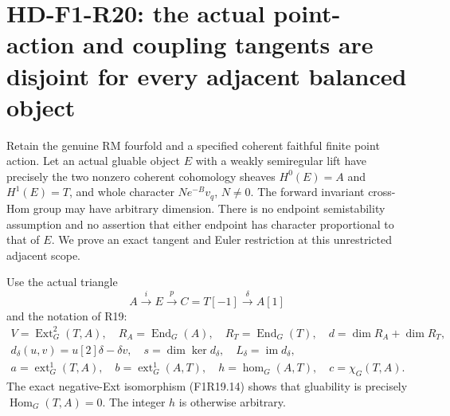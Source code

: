 \section[HD-F1-R20: unrestricted adjacent coupling tangents]{HD-F1-R20: the actual point-action and coupling tangents are disjoint for every adjacent balanced object}
\label{sec:followup-rm-unrestricted-adjacent-tangent}

Retain the genuine RM fourfold and a specified coherent
faithful finite point action. Let an actual gluable object
$E$ with a weakly semiregular lift have precisely the two
nonzero coherent cohomology sheaves $H^0(E)=A$ and
$H^1(E)=T$, and whole character $Ne^{-B}v_q$, $N\ne0$.
The forward invariant cross-Hom group may have arbitrary
dimension. There is no endpoint semistability assumption
and no assertion
that either endpoint has character proportional to that
of $E$. We prove an exact tangent and Euler restriction
at this unrestricted adjacent scope.

Use the actual triangle
\[
       A\xrightarrow{i}E\xrightarrow{p}C=T[-1]
                    \xrightarrow{\delta}A[1]
 \tag{F1R20.1}
\]
and the notation of R19:
\[
 \begin{gathered}
 V=\operatorname{Ext}^2_G(T,A),\quad
 R_A=\operatorname{End}_G(A),\quad R_T=\operatorname{End}_G(T),\quad
 d=\dim R_A+\dim R_T,\\
 d_\delta(u,v)=u[2]\delta-\delta v,\quad
 s=\dim\ker d_\delta,\quad L_\delta=\operatorname{im}d_\delta,\\
 a=\operatorname{ext}^1_G(T,A),\quad
 b=\operatorname{ext}^1_G(A,T),\quad
 h=\operatorname{hom}_G(A,T),\quad c=\chi_G(T,A).
 \end{gathered}
 \tag{F1R20.2}
\]
The exact negative-Ext isomorphism (F1R19.14) shows
that gluability is precisely
$\operatorname{Hom}_G(T,A)=0$. The integer $h$ is
otherwise arbitrary.

